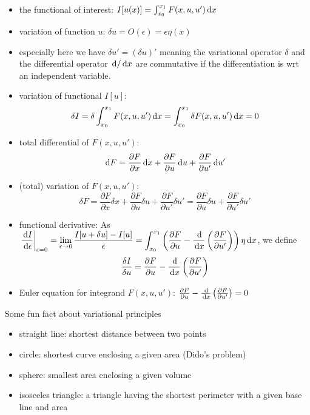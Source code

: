 \documentclass{article}
\begin{document}
\begin{itemize}
    \item the functional of interest: \(I[u(x)] = \int_{x_0}^{x_1} F(x,u,u')\,\mathrm{d} x\)
    \item variation of function \(u\): \(\delta u=O(\epsilon) = \epsilon\eta(x)\) \item especially here we have \(\delta u'=(\delta u)'\) meaning the variational operator \(\delta\) and the differential operator \(\,\mathrm{d}/\,\mathrm{d} x\) are commutative if the differentiation is wrt an independent variable.
    \item variation of functional \(I[u]\):
    \[\delta I = \delta \int_{x_0}^{x_1} F(x,u,u')\,\mathrm{d} x = \int_{x_0}^{x_1}\delta F(x,u,u') \,\mathrm{d} x=0\]
    \item total differential of \(F(x,u,u')\):
    \[\,\mathrm{d} F = \frac{\partial F}{\partial x}\,\mathrm{d} x+\frac{\partial F}{\partial u}\,\mathrm{d} u+\frac{\partial F}{\partial u'}\,\mathrm{d} u'\]
    \item (total) variation of \(F(x,u,u')\):
    \[\delta F = \frac{\partial F}{\partial x}\delta x+\frac{\partial F}{\partial u}\delta u+\frac{\partial F}{\partial u'}\delta u'=\frac{\partial F}{\partial u}\delta u+\frac{\partial F}{\partial u'}\delta u'\]
    \item functional derivative: As \(\left.\dfrac{\,\mathrm{d} I}{\,\mathrm{d}\epsilon}\right|_{\epsilon=0}=\displaystyle\lim_{\epsilon\to0}\frac{I[u+\delta u]-I[u]}{\epsilon}=\int_{x_0}^{x_1}\left( \frac{\partial F}{\partial u}-\frac{\,\mathrm{d} }{\,\mathrm{d} x}\left( \frac{\partial F}{\partial u'} \right) \right)\eta\,\mathrm{d} x\), we define
    \[\frac{\delta I}{\delta u}=\frac{\partial F}{\partial u}-\frac{\,\mathrm{d} }{\,\mathrm{d} x}\left( \frac{\partial F}{\partial u'} \right)\]
    \item Euler equation for integrand \(F(x,u,u')\): \(\frac{\partial F}{\partial u}-\frac{\,\mathrm{d} }{\,\mathrm{d} x}\left( \frac{\partial F}{\partial u'} \right)=0\)
\end{itemize}

Some fun fact about variational principles
\begin{itemize}
    \item straight line: shortest distance between two points
    \item circle: shortest curve enclosing a given area (Dido's problem)
    \item sphere: smallest area enclosing a given volume
    \item isosceles triangle: a triangle having the shortest perimeter with a given
    base line and area
\end{itemize}
\end{document}
